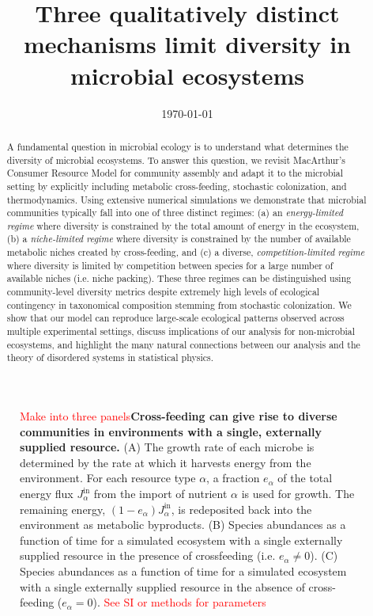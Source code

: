\documentclass[aps,amsmath,graphix,amssymb,longbibliography]{revtex4-1}
\newcommand\0{\scalebox{-1}[1]{0}}
\newcommand*{\red}{\textcolor{red}}
\begin{document}
\title{Three qualitatively distinct mechanisms  limit diversity in microbial ecosystems }


\date{\today{}}

\begin{abstract}
A fundamental question  in microbial ecology is to understand what determines the diversity of microbial ecosystems. To answer this question, we revisit MacArthur's Consumer Resource Model for community assembly and adapt it to the microbial setting by explicitly including metabolic cross-feeding, stochastic colonization, and thermodynamics.  Using extensive numerical simulations we demonstrate that microbial communities typically fall into one of three  distinct regimes: (a) an \emph{energy-limited regime} where diversity is constrained by the total amount of energy in the ecosystem, (b) a \emph{niche-limited regime} where diversity is constrained by the number of available metabolic niches created by cross-feeding, and (c) a diverse, \emph{competition-limited regime} where diversity is limited by competition between species for a large number of available niches (i.e. niche packing). These three regimes can be distinguished using community-level diversity metrics despite extremely high levels of ecological contingency in taxonomical composition stemming from stochastic colonization. We show that our model can reproduce large-scale ecological patterns observed across multiple experimental settings, discuss implications of our analysis for non-microbial ecosystems, and highlight the many natural connections between our analysis and the theory of disordered systems in statistical physics.
\end{abstract}




\maketitle

\begin{figure}
\caption{ \red{ Make into three panels}{\bf Cross-feeding can give rise to diverse communities in environments with a single, externally supplied resource.} (A) The growth rate of each microbe is determined by the rate at which it harvests energy from the environment. For each resource type $\alpha$, a fraction $e_\alpha$ of the total energy flux $J_\alpha^\mathrm{in}$ from the import of nutrient $\alpha$ is used for growth. The remaining energy, $(1-e_\alpha) J_\alpha^\mathrm{in}$, is redeposited back into the environment as metabolic byproducts. (B) Species abundances as a function of time for a simulated ecosystem with a single externally supplied resource in the presence of crossfeeding (i.e. $e_\alpha \neq 0$). (C) Species abundances as a function of time for a simulated ecosystem with a single externally supplied resource in the absence of cross-feeding ($e_\alpha =0$).  \red{See SI or methods for parameters} }
\end{figure}
\end{document}
